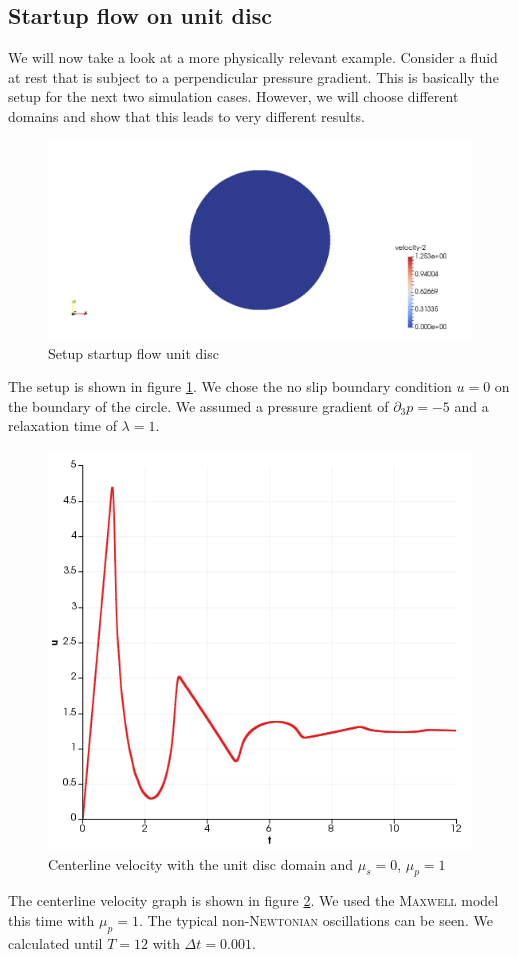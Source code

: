 \documentclass[12pt,a4paper,twoside, open=right]{scrreprt}
\theoremstyle{definition}
\theoremstyle{plain}
\begin{document}
\subsection{Startup flow on unit disc}
We will now take a look at a more physically relevant example. Consider a fluid at rest that is subject to a perpendicular pressure gradient. This is basically the setup for the next two simulation cases. However, we will choose different domains and show that this leads to very different results. 
\begin{figure}
    \centering
    \includegraphics[width=\textwidth]{UnitDiscSetup}
    \caption{Setup startup flow unit disc}
    \label{fig:unitdiscsetup}
\end{figure}
The setup is shown in figure \ref{fig:unitdiscsetup}. We chose the no slip boundary condition $u=0$ on the boundary of the circle. We assumed a pressure gradient of $\partial_3 p=-5$ and a relaxation time of $\lambda=1$. 
\begin{figure}
    \centering
    \includegraphics[width=\textwidth]{UnitDiscCenterline}
    \caption{Centerline velocity with the unit disc domain and $\mu_s=0$, $\mu_p=1$}
    \label{fig:unitdisccenterline}
\end{figure}
The centerline velocity graph is shown in figure \ref{fig:unitdisccenterline}. We used the \textsc{Maxwell} model this time with $\mu_p=1$. The typical non-\textsc{Newtonian} oscillations can be seen. We calculated until $T=12$ with $\Delta t=0.001$.
\end{document}
